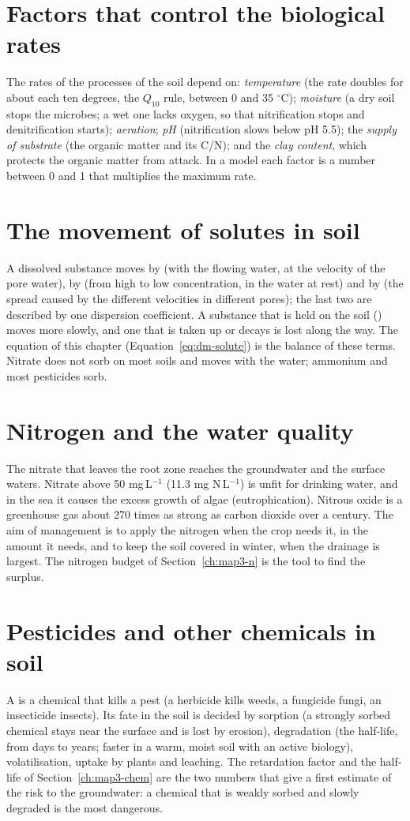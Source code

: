 \section{Factors that control the biological rates}
The rates of the processes of the soil depend on: \emph{temperature} (the rate doubles for about each ten degrees, the $Q_{10}$ rule, between 0 and 35 $^\circ$C); \emph{moisture} (a dry soil stops the microbes; a wet one lacks oxygen, so that nitrification stops and denitrification starts); \emph{aeration}; \emph{pH} (nitrification slows below pH 5.5); the \emph{supply of substrate} (the organic matter and its C/N); and the \emph{clay content}, which protects the organic matter from attack. In a model each factor is a number between 0 and 1 that multiplies the maximum rate.

\section{The movement of solutes in soil}
A dissolved substance moves by  (with the flowing water, at the velocity of the pore water), by  (from high to low concentration, in the water at rest) and by  (the spread caused by the different velocities in different pores); the last two are described by one dispersion coefficient. A substance that is held on the soil () moves more slowly, and one that is taken up or decays is lost along the way. The equation of this chapter (Equation~\ref{eq:dm-solute}) is the balance of these terms. Nitrate does not sorb on most soils and moves with the water; ammonium and most pesticides sorb.

\section{Nitrogen and the water quality}
The nitrate that leaves the root zone reaches the groundwater and the surface waters. Nitrate above 50 mg\,L$^{-1}$ (11.3 mg N\,L$^{-1}$) is unfit for drinking water, and in the sea it causes the excess growth of algae (eutrophication). Nitrous oxide is a greenhouse gas about 270 times as strong as carbon dioxide over a century. The aim of management is to apply the nitrogen when the crop needs it, in the amount it needs, and to keep the soil covered in winter, when the drainage is largest. The nitrogen budget of Section~\ref{ch:map3-n} is the tool to find the surplus.

\section{Pesticides and other chemicals in soil}
A  is a chemical that kills a pest (a herbicide kills weeds, a fungicide fungi, an insecticide insects). Its fate in the soil is decided by sorption (a strongly sorbed chemical stays near the surface and is lost by erosion), degradation (the half-life, from days to years; faster in a warm, moist soil with an active biology), volatilisation, uptake by plants and leaching. The retardation factor and the half-life of Section~\ref{ch:map3-chem} are the two numbers that give a first estimate of the risk to the groundwater: a chemical that is weakly sorbed and slowly degraded is the most dangerous.
